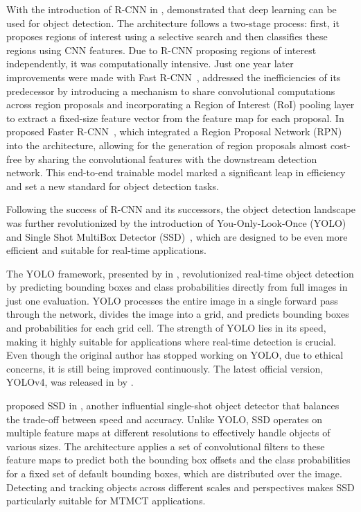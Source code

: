 With the introduction of R-CNN in \citeyear{Girshick14}, \textcite{Girshick14} demonstrated that deep learning can be used for object detection. The architecture follows a two-stage process: first, it proposes regions of interest using a selective search and then classifies these regions using CNN features. Due to R-CNN proposing regions of interest independently, it was computationally intensive. Just one year later improvements were made with Fast R-CNN~\cite{Girshick15}, addressed the inefficiencies of its predecessor by introducing a mechanism to share convolutional computations across region proposals and incorporating a Region of Interest (RoI) pooling layer to extract a fixed-size feature vector from the feature map for each proposal. In \citeyear{Ren17} \citeauthor{Ren17} proposed Faster R-CNN~\cite{Ren17}, which integrated a Region Proposal Network (RPN) into the architecture, allowing for the generation of region proposals almost cost-free by sharing the convolutional features with the downstream detection network. This end-to-end trainable model marked a significant leap in efficiency and set a new standard for object detection tasks.

Following the success of R-CNN and its successors, the object detection landscape was further revolutionized by the introduction of You-Only-Look-Once (YOLO)~\cite{Redmon15} and Single Shot MultiBox Detector (SSD)~\cite{Liu15}, which are designed to be even more efficient and suitable for real-time applications.

The YOLO framework, presented by \citeauthor{Redmon15} in \citeyear{Redmon15}, revolutionized real-time object detection by predicting bounding boxes and class probabilities directly from full images in just one evaluation. YOLO processes the entire image in a single forward pass through the network, divides the image into a grid, and predicts bounding boxes and probabilities for each grid cell. The strength of YOLO lies in its speed, making it highly suitable for applications where real-time detection is crucial. Even though the original author has stopped working on YOLO, due to ethical concerns, it is still being improved continuously. The latest official version, YOLOv4, was released in \citeyear{Bochkovskiy20} by \textcite{Bochkovskiy20}.

\citeauthor{Liu15} proposed SSD in \citeyear{Liu15}, another influential single-shot object detector that balances the trade-off between speed and accuracy. Unlike YOLO, SSD operates on multiple feature maps at different resolutions to effectively handle objects of various sizes. The architecture applies a set of convolutional filters to these feature maps to predict both the bounding box offsets and the class probabilities for a fixed set of default bounding boxes, which are distributed over the image. Detecting and tracking objects across different scales and perspectives makes SSD particularly suitable for MTMCT applications.


